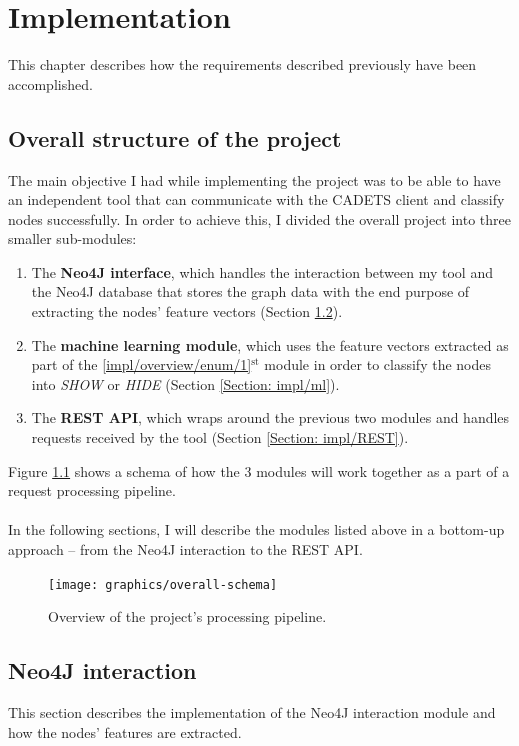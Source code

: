 
	\chapter{Implementation}
	This chapter describes how the requirements described previously have been accomplished. 
	\section{Overall structure of the project} \label{Section: impl/overview}
	The main objective I had while implementing the project was to be able to have an independent tool that can communicate with the CADETS client and classify nodes successfully. In order to achieve this, I divided the overall project into three smaller sub-modules:
	
	\begin{enumerate}
		\item \label{impl/overview/enum/1} The \textbf{Neo4J interface}, which handles the interaction between my tool and the Neo4J database that stores the graph data with the end purpose of extracting the nodes' feature vectors (Section \ref{Section: impl/neo4j}).
		
		\item The \textbf{machine learning module}, which uses the feature vectors extracted as part of the \ref{impl/overview/enum/1}$^{\text{st}}$ module in order to classify the nodes into \textit{SHOW} or \textit{HIDE} (Section \ref{Section: impl/ml}).
		
		\item The \textbf{REST API}, which wraps around the previous two modules and handles requests received by the tool (Section \ref{Section: impl/REST}).
	\end{enumerate}
	Figure \ref{Fig: impl/pipeline} shows a schema of how the 3 modules will work together as a part of a request processing pipeline. 
	\\ \\
	In the following sections, I will describe the modules listed above in a bottom-up approach -- from the Neo4J interaction to the REST API. 
	\begin{figure}[H]
		\centering
		\texttt{[image: graphics/overall-schema]}	
		\caption[Processing pipeline]{Overview of the project's processing pipeline.}
		\label{Fig: impl/pipeline}
	\end{figure}
	\section{Neo4J interaction} \label{Section: impl/neo4j}
	This section describes the implementation of the Neo4J interaction module and how the nodes' features are extracted. 
